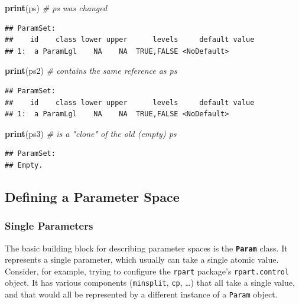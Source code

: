 \documentclass[]{scrbook}
\newenvironment{Shaded}{\begin{snugshade}}{\end{snugshade}}
\newcommand{\CommentTok}[1]{\textcolor[rgb]{0.56,0.35,0.01}{\textit{#1}}}
\newcommand{\KeywordTok}[1]{\textcolor[rgb]{0.13,0.29,0.53}{\textbf{#1}}}
\newcommand{\NormalTok}[1]{#1}
\renewenvironment{Shaded} {\begin{snugshade}\small} {\end{snugshade}}
\begin{document}
\begin{Shaded}
\begin{Highlighting}[]
\KeywordTok{print}\NormalTok{(ps)  }\CommentTok{# ps was changed}
\end{Highlighting}
\end{Shaded}

\begin{verbatim}
## ParamSet: 
##    id    class lower upper      levels     default value
## 1:  a ParamLgl    NA    NA  TRUE,FALSE <NoDefault>
\end{verbatim}

\begin{Shaded}
\begin{Highlighting}[]
\KeywordTok{print}\NormalTok{(ps2) }\CommentTok{# contains the same reference as ps}
\end{Highlighting}
\end{Shaded}

\begin{verbatim}
## ParamSet: 
##    id    class lower upper      levels     default value
## 1:  a ParamLgl    NA    NA  TRUE,FALSE <NoDefault>
\end{verbatim}

\begin{Shaded}
\begin{Highlighting}[]
\KeywordTok{print}\NormalTok{(ps3) }\CommentTok{# is a "clone" of the old (empty) ps}
\end{Highlighting}
\end{Shaded}

\begin{verbatim}
## ParamSet: 
## Empty.
\end{verbatim}

\hypertarget{defining-a-parameter-space}{%
\subsection{Defining a Parameter Space}\label{defining-a-parameter-space}}

\hypertarget{single-parameters}{%
\subsubsection{Single Parameters}\label{single-parameters}}

The basic building block for describing parameter spaces is the \textbf{\texttt{Param}} class.
It represents a single parameter, which usually can take a single atomic value.
Consider, for example, trying to configure the \texttt{rpart} package's \texttt{rpart.control} object.
It has various components (\texttt{minsplit}, \texttt{cp}, \ldots{}) that all take a single value, and that would all be represented by a different instance of a \texttt{Param} object.
\end{document}
